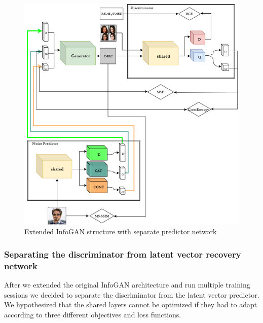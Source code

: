 \documentclass{egpubl}
\begin{document}
\begin{figure}[!htb]
	\centering
	\includegraphics[width=\linewidth]{pic/2}
	\caption{Extended InfoGAN structure with separate predictor network}
	\label{fig:infogan_noise}
\end{figure}



\subsubsection{Separating the discriminator from latent vector recovery network}

After we extended the original InfoGAN architecture and run multiple training sessions we decided to separate the discriminator from the latent vector predictor. We hypothesized that the shared layers cannot be optimized if they had to adapt according to three different objectives and loss functions.
\end{document}
